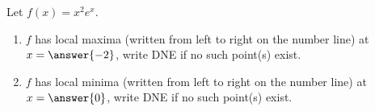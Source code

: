 \documentclass{ximera}
\author{Gregory Hartman \and Matthew Carr}
\begin{document}
\begin{exercise}






Let $f(x)=x^{2}e^x$.
\begin{enumerate}
\item		$f$ has local maxima (written from left to right on the number line) at $x=\answer{-2}$, write DNE if no such point(s) exist.
\item		$f$ has local minima (written from left to right on the number line) at $x=\answer{0}$, write DNE if no such point(s) exist.
\end{enumerate}

\end{exercise}
\end{document}
